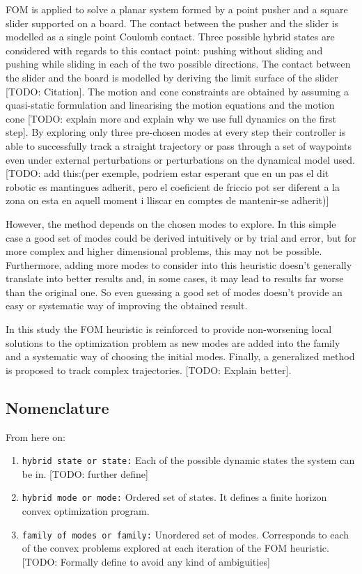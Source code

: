 \documentclass[12,twoside]{TFG-GM}
\theoremstyle{definition}
\theoremstyle{remark}
\begin{document}
FOM is applied to solve a planar system formed by a point pusher and a square slider supported on a board. The contact between the pusher and the slider is modelled as a single point Coulomb contact. Three possible hybrid states are considered with regards to this contact point: pushing without sliding and pushing while sliding in each of the two possible directions. The contact between the slider and the board is modelled by deriving the limit surface of the slider [TODO: Citation]. The motion and cone constraints are obtained by assuming a quasi-static formulation and linearising the motion equations and the motion cone [TODO: explain more and explain why we use full dynamics on the first step]. By exploring only three pre-chosen modes at every step their controller is able to successfully track a straight trajectory or pass through a set of waypoints even under external perturbations or perturbations on the dynamical model used. [TODO: add this:(per exemple, podriem estar esperant que en un pas el dit robotic es mantingues adherit, pero el coeficient de friccio pot ser diferent a la zona on esta en aquell moment i lliscar en comptes de mantenir-se adherit)]

However, the method depends on the chosen modes to explore. In this simple case a good set of modes could be derived intuitively or by trial and error, but for more complex and higher dimensional problems, this may not be possible. Furthermore, adding more modes to consider into this heuristic doesn't generally translate into better results and, in some cases, it may lead to results far worse than the original one. So even guessing a good set of modes doesn't provide an easy or systematic way of improving the obtained result.

In this study the FOM heuristic is reinforced to provide non-worsening local solutions to the optimization problem as new modes are added into the family and a systematic way of choosing the initial modes. Finally, a generalized method is proposed to track complex trajectories. [TODO: Explain better].



\subsection{Nomenclature}
\label{subsec:nomenclature}
From here on:
\begin{enumerate}[\bf (1)]
\item{\tt hybrid state or state:} Each of the possible dynamic states the system can be in. [TODO: further define]
\item{\tt hybrid mode or mode:} Ordered set of states. It defines a finite horizon convex optimization program.
\item{\tt family of modes or family:} Unordered set of modes. Corresponds to each of the convex problems explored at each iteration of the FOM heuristic.
[TODO: Formally define to avoid any kind of ambiguities]
\end{enumerate}
\end{document}
